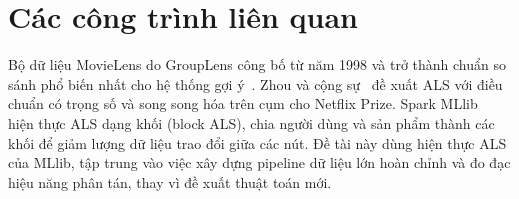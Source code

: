\section{Các công trình liên quan}
\label{sec:lien_quan}
Bộ dữ liệu MovieLens do GroupLens công bố từ năm 1998 và trở thành chuẩn so sánh phổ biến nhất cho hệ thống gợi ý~\cite{harper2015movielens}. Zhou và cộng sự~\cite{zhou2008als} đề xuất ALS với điều chuẩn có trọng số và song song hóa trên cụm cho Netflix Prize. Spark MLlib~\cite{meng2016mllib} hiện thực ALS dạng khối (block ALS), chia người dùng và sản phẩm thành các khối để giảm lượng dữ liệu trao đổi giữa các nút. Đề tài này dùng hiện thực ALS của MLlib, tập trung vào việc xây dựng pipeline dữ liệu lớn hoàn chỉnh và đo đạc hiệu năng phân tán, thay vì đề xuất thuật toán mới.
